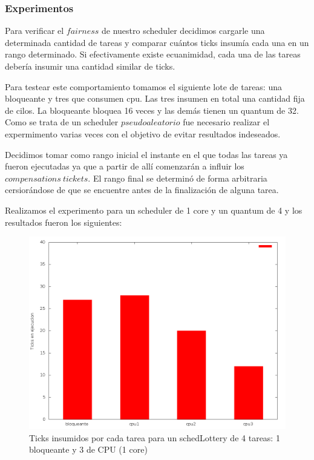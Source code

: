 \subsubsection{Experimentos}

Para verificar el $fairness$ de nuestro scheduler decidimos cargarle una determinada cantidad de tareas y comparar cuántos ticks insumía cada una en un rango determinado. Si efectivamente existe ecuanimidad, cada una de las tareas debería insumir una cantidad similar de ticks.

Para testear este comportamiento tomamos el siguiente lote de tareas: una bloqueante y tres que consumen cpu. Las tres insumen en total una cantidad fija de cilos. La bloqueante bloquea 16 veces y las demás tienen un quantum de 32. Como se trata de un scheduler $pseudoaleatorio$ fue necesario realizar el expermimento varias veces con el objetivo de evitar resultados indeseados.

Decidimos tomar como rango inicial el instante en el que todas las tareas ya fueron ejecutadas ya que a partir de allí comenzarán a influir los $compensations \ tickets$. El rango final se determinó de forma arbitraria cersiorándose de que se encuentre antes de la finalización de alguna tarea.

Realizamos el experimento para un scheduler de 1 core y un quantum de 4 y los resultados fueron los siguientes:

\begin{figure}[!h]
	\begin{center}
		  \includegraphics[scale=0.3]{Graficos/comp1.png}
		  \caption{Ticks insumidos por cada tarea para un schedLottery de 4 tareas: 1 bloqueante y 3 de CPU (1 core)}
		  \label{fig:contra1}
	\end{center}
\end{figure}
\FloatBarrier

